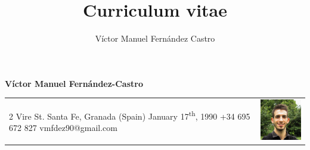 \documentclass[12pt,a4paper]{article}
\title{Curriculum vitae}
\author{Víctor Manuel Fernández Castro}
\begin{document}
	\large
	
	\begin{center}
		\textbf{Víctor Manuel Fernández-Castro}
	\end{center}
	
	\normalsize
	\centering

	\begin{tabular}{m{}m{}}
		2 Vire St. \newline
		Santa Fe, Granada (Spain) \newline
		January 17\textsuperscript{th}, 1990 \newline
		\newline
		+34 695 672 827 \newline
		vmfdez90@gmail.com & \includegraphics[width=3cm]{photo}
	\end{tabular}
	
	
\end{document}
